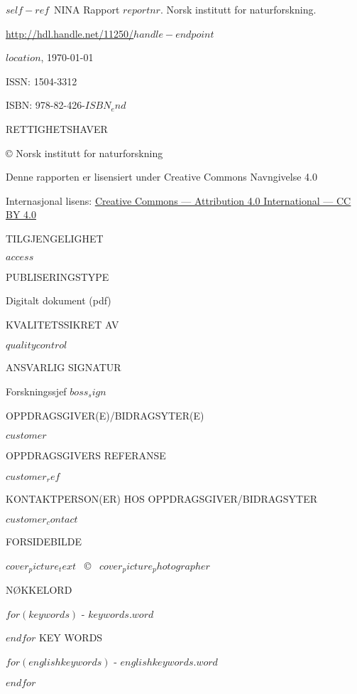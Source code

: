\documentclass[11pt, a4paper]{article}
\renewcommand*{\href}[2]{\hyperref[#1]{\color{darkblue}\setulcolor{darkblue}\ul{#2}}}
\newcommand{\smallspace}{\vspace{3mm}}
\begin{document}
\normalsize
{}
\small{$self-ref$}~NINA Rapport $reportnr$. Norsk institutt for naturforskning. \par \href{http://hdl.handle.net/11250/$handle-endpoint$}{http://hdl.handle.net/11250/$handle-endpoint$} \par \smallspace
$location$, \ninadate\today \par \smallspace
ISSN: 1504-3312 \par
ISBN: 978-82-426-$ISBN_end$ \par  \smallspace
{\scriptsize{RETTIGHETSHAVER}} \par
© Norsk institutt for naturforskning  \par
Denne rapporten er lisensiert under Creative Commons Navngivelse 4.0 \par
Internasjonal lisens: \href{https://creativecommons.org/licenses/by/4.0/}{Creative Commons — Attribution 4.0 International — CC BY 4.0}\par \smallspace
{\scriptsize{TILGJENGELIGHET}} \par
$access$ \par \smallspace
{\scriptsize{PUBLISERINGSTYPE}} \par
Digitalt dokument (pdf) \par \smallspace
{\scriptsize{KVALITETSSIKRET AV}} \par
$qualitycontrol$ \par \smallspace
{\scriptsize{ANSVARLIG SIGNATUR}} \par
Forskningssjef $boss_sign$ \par \smallspace
{\scriptsize{OPPDRAGSGIVER(E)/BIDRAGSYTER(E)}} \par
$customer$ \par \smallspace
{\scriptsize{OPPDRAGSGIVERS REFERANSE}} \par
$customer_ref$ \par \smallspace
{\scriptsize{KONTAKTPERSON(ER) HOS OPPDRAGSGIVER/BIDRAGSYTER}} \par
$customer_contact$ \par \smallspace
{\scriptsize{FORSIDEBILDE}} \par
$cover_picture_text$~ \copyright~ $cover_picture_photographer$ \par \smallspace
{\scriptsize{NØKKELORD}} \par\smallskip
$for(keywords)$
\small{\hyp{} $keywords.word$} \par
$endfor$
\vspace{5mm}
{\scriptsize{KEY WORDS}} \par\smallskip
$for(englishkeywords)$
\small{\hyp{} $englishkeywords.word$} \par
$endfor$
\end{document}
